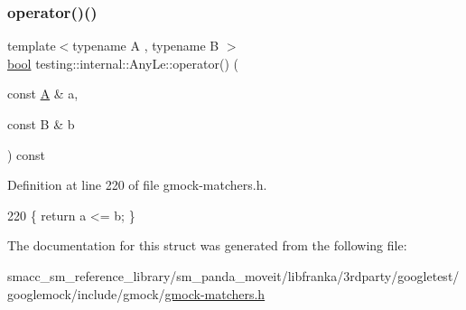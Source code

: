 \subsubsection{\texorpdfstring{operator()()}{operator()()}}
{\footnotesize\ttfamily template$<$typename A , typename B $>$ \\
\hyperlink{classbool}{bool} testing\+::internal\+::\+Any\+Le\+::operator() (\begin{DoxyParamCaption}\item[{const \hyperlink{namespacetesting_a5e9134d655d2fc9323902348083282e7}{A} \&}]{a,  }\item[{const B \&}]{b }\end{DoxyParamCaption}) const\hspace{0.3cm}{\ttfamily [inline]}}



Definition at line 220 of file gmock-\/matchers.\+h.


\begin{DoxyCode}
220 \{ \textcolor{keywordflow}{return} a <= b; \}
\end{DoxyCode}


The documentation for this struct was generated from the following file\+:\begin{DoxyCompactItemize}
\item 
smacc\+\_\+sm\+\_\+reference\+\_\+library/sm\+\_\+panda\+\_\+moveit/libfranka/3rdparty/googletest/googlemock/include/gmock/\hyperlink{gmock-matchers_8h}{gmock-\/matchers.\+h}\end{DoxyCompactItemize}
